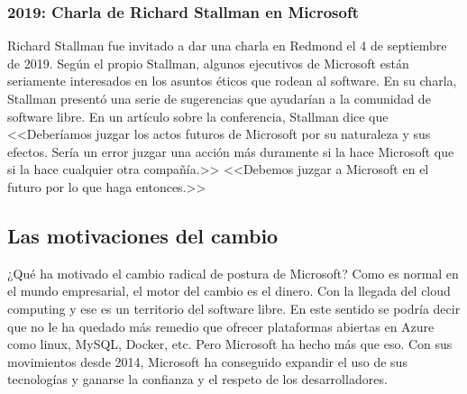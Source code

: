 \subsubsection{2019: Charla de Richard Stallman en Microsoft}
Richard Stallman fue invitado a dar una charla en Redmond el 4 de septiembre de 2019. Según el propio Stallman, algunos ejecutivos de Microsoft están seriamente interesados en los asuntos éticos que rodean al software. En su charla, Stallman presentó una serie de sugerencias que ayudarían a la comunidad de software libre. En un artículo sobre la conferencia, Stallman dice que <<Deberíamos juzgar los actos futuros de Microsoft por su naturaleza y sus efectos. Sería un error juzgar una acción más duramente si la hace Microsoft que si la hace cualquier otra compañía.>> <<Debemos juzgar a Microsoft en el futuro por lo que haga entonces.>> \cite{stallman_2019}

\subsection{Las motivaciones del cambio}
¿Qué ha motivado el cambio radical de postura de Microsoft? Como es normal en el mundo empresarial, el motor del cambio es el dinero. Con la llegada del cloud computing y ese es un territorio del software libre. En este sentido se podría decir que no le ha quedado más remedio que ofrecer plataformas abiertas en Azure como linux, MySQL, Docker, etc. Pero Microsoft ha hecho más que eso. Con sus movimientos desde 2014, Microsoft ha conseguido expandir el uso de sus tecnologías y ganarse la confianza y el respeto de los desarrolladores.